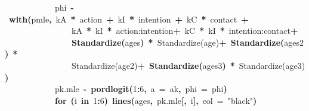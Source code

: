 \documentclass{article}
\makeatletter
\newcommand{\hlnumber}[1]{\textcolor[rgb]{0,0,0}{#1}}%
\newcommand{\hlfunctioncall}[1]{\textcolor[rgb]{.5,0,.33}{\textbf{#1}}}%
\newcommand{\hlstring}[1]{\textcolor[rgb]{.6,.6,1}{#1}}%
\newcommand{\hlkeyword}[1]{\textbf{#1}}%
\newcommand{\hlargument}[1]{\textcolor[rgb]{.69,.25,.02}{#1}}%
\newcommand{\hlassignement}[1]{\textbf{#1}}%
\newcommand{\hlsymbol}[1]{#1}%
\newcommand{\hlstd}[1]{\textcolor[rgb]{0,0,0}{#1}}%
\newenvironment{kframe}{%
 \def\FrameCommand##1{\hskip\@totalleftmargin \hskip-\fboxsep
 \colorbox{shadecolor}{##1}\hskip-\fboxsep
     \hskip-\linewidth \hskip-\@totalleftmargin \hskip\columnwidth}%
 \MakeFramed {\advance\hsize-\width
   \@totalleftmargin\z@ \linewidth\hsize
   \@setminipage}}%
 {\par\unskip\endMakeFramed}
\newenvironment{knitrout}{}{} %
\makeatother
\begin{document}
\begin{knitrout}
{\begin{kframe}
\begin{flushleft}
\hlstd{}{\ }{\ }{\ }{\ }{\ }{\ }{\ }{\ }{\ }{\ }{\ }{\ }\hlsymbol{phi}{\ }\hlassignement{\usebox{\hlnormalsizeboxlessthan}-}{\ }\hlfunctioncall{with}\hlkeyword{(}\hlsymbol{pmle}\hlkeyword{,}{\ }\hlsymbol{kA}{\ }\hlkeyword{*}{\ }\hlsymbol{action}{\ }\hlkeyword{+}{\ }\hlsymbol{kI}{\ }\hlkeyword{*}{\ }\hlsymbol{intention}{\ }\hlkeyword{+}{\ }\hlsymbol{kC}{\ }\hlkeyword{*}{\ }\hlsymbol{contact}{\ }\hlkeyword{+}\hspace*{\fill}\\
\hlstd{}{\ }{\ }{\ }{\ }{\ }{\ }{\ }{\ }{\ }{\ }{\ }{\ }{\ }{\ }{\ }{\ }\hlsymbol{kA}{\ }\hlkeyword{*}{\ }\hlsymbol{kI}{\ }\hlkeyword{*}{\ }\hlsymbol{\usebox{\hlnormalsizeboxbacktick}action:intention\usebox{\hlnormalsizeboxbacktick}}{\ }\hlkeyword{+}{\ }\hlsymbol{kC}{\ }\hlkeyword{*}{\ }\hlsymbol{kI}{\ }\hlkeyword{*}{\ }\hlsymbol{\usebox{\hlnormalsizeboxbacktick}intention:contact\usebox{\hlnormalsizeboxbacktick}}{\ }\hlkeyword{+}\hspace*{\fill}\\
\hlstd{}{\ }{\ }{\ }{\ }{\ }{\ }{\ }{\ }{\ }{\ }{\ }{\ }{\ }{\ }{\ }{\ }\hlfunctioncall{Standardize}\hlkeyword{(}\hlsymbol{ages}\hlkeyword{)}{\ }\hlkeyword{*}{\ }\hlsymbol{\usebox{\hlnormalsizeboxbacktick}Standardize(age)\usebox{\hlnormalsizeboxbacktick}}{\ }\hlkeyword{+}{\ }\hlfunctioncall{Standardize}\hlkeyword{(}\hlsymbol{ages}\hlkeyword{\usebox{\hlnormalsizeboxhat}}\hlnumber{2}\hlkeyword{)}{\ }\hlkeyword{*}\hspace*{\fill}\\
\hlstd{}{\ }{\ }{\ }{\ }{\ }{\ }{\ }{\ }{\ }{\ }{\ }{\ }{\ }{\ }{\ }{\ }\hlsymbol{\usebox{\hlnormalsizeboxbacktick}Standardize(age\usebox{\hlnormalsizeboxhat}2)\usebox{\hlnormalsizeboxbacktick}}{\ }\hlkeyword{+}{\ }\hlfunctioncall{Standardize}\hlkeyword{(}\hlsymbol{ages}\hlkeyword{\usebox{\hlnormalsizeboxhat}}\hlnumber{3}\hlkeyword{)}{\ }\hlkeyword{*}{\ }\hlsymbol{\usebox{\hlnormalsizeboxbacktick}Standardize(age\usebox{\hlnormalsizeboxhat}3)\usebox{\hlnormalsizeboxbacktick}}\hlkeyword{)}\hspace*{\fill}\\
\hlstd{}{\ }{\ }{\ }{\ }{\ }{\ }{\ }{\ }{\ }{\ }{\ }{\ }\hlsymbol{pk.mle}{\ }\hlassignement{\usebox{\hlnormalsizeboxlessthan}-}{\ }\hlfunctioncall{pordlogit}\hlkeyword{(}\hlnumber{1}\hlkeyword{:}\hlnumber{6}\hlkeyword{,}{\ }\hlargument{a}{\ }\hlargument{=}{\ }\hlsymbol{ak}\hlkeyword{,}{\ }\hlargument{phi}{\ }\hlargument{=}{\ }\hlsymbol{phi}\hlkeyword{)}\hspace*{\fill}\\
\hlstd{}{\ }{\ }{\ }{\ }{\ }{\ }{\ }{\ }{\ }{\ }{\ }{\ }\hlkeyword{for}{\ }\hlkeyword{(}\hlsymbol{i}{\ }\hlkeyword{in}{\ }\hlnumber{1}\hlkeyword{:}\hlnumber{6}\hlkeyword{)}{\ }\hlfunctioncall{lines}\hlkeyword{(}\hlsymbol{ages}\hlkeyword{,}{\ }\hlsymbol{pk.mle}\hlkeyword{[}\hlkeyword{,}{\ }\hlsymbol{i}\hlkeyword{]}\hlkeyword{,}{\ }\hlargument{col}{\ }\hlargument{=}{\ }\hlstring{"black"}\hlkeyword{)}\hspace*{\fill}\\

\end{flushleft}
\end{kframe}}
\end{knitrout}
\end{document}
